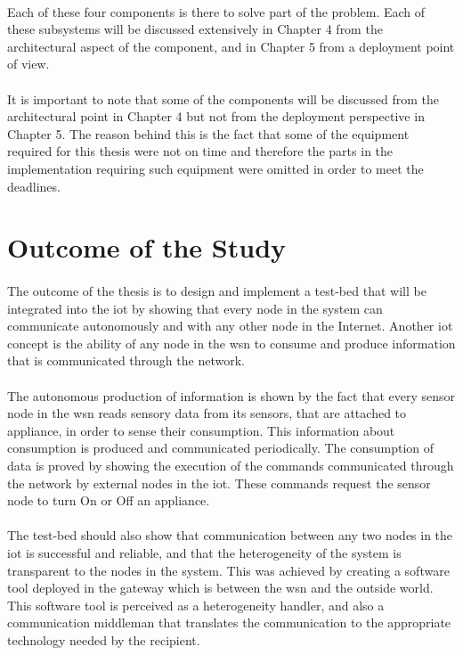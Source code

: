 \documentclass[12pt,a4paper,final]{report}
\begin{document}
\paragraph{}
Each of these four components is there to solve part of the problem. Each of these subsystems will be discussed extensively in Chapter 4 from the architectural aspect of the component, and in Chapter 5 from a deployment point of view. 
\paragraph{}
It is important to note that some of the components will be discussed from the architectural point in Chapter 4 but not from the deployment perspective in Chapter 5. The reason behind this is the fact that some of the equipment required for this thesis were not on time and therefore the parts in the implementation requiring such equipment were omitted in order to meet the deadlines.
\section{Outcome of the Study}
\paragraph{}
The outcome of the thesis is to design and implement a test-bed that will be integrated into the \gls{iot} by showing that every node in the system can communicate autonomously and with any other node in the Internet. Another \gls{iot} concept is the ability of any node in the \gls{wsn} to consume and produce information that is communicated through the network.
\paragraph{}
The autonomous production of information is shown by the fact that every sensor node in the \gls{wsn} reads sensory data from its sensors, that are attached to appliance, in order to sense their consumption. This information about consumption is produced and communicated periodically. The consumption of data is proved by showing the execution of the commands communicated through the network by external nodes in the \gls{iot}. These commands request the sensor node to turn On or Off an appliance.
\paragraph{}
The test-bed should also show that communication between any two nodes in the \gls{iot} is successful and reliable, and that the heterogeneity of the system is transparent to the nodes in the system. This was achieved by creating a software tool deployed in the gateway which is between the \gls{wsn} and the outside world. This software tool is perceived as a heterogeneity handler, and also a communication middleman that translates the communication to the appropriate technology needed by the recipient.
\end{document}
